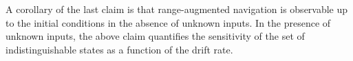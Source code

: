 \documentclass[]{article}
\def\w{\omega}
\def\ww{\tilde\w}
\begin{document}


A corollary of the last claim is that range-augmented navigation is observable up to the initial conditions in the absence of unknown inputs. In the presence of unknown inputs, the above claim quantifies the sensitivity of the set of indistinguishable states as a function of the drift rate. 


\end{document}

